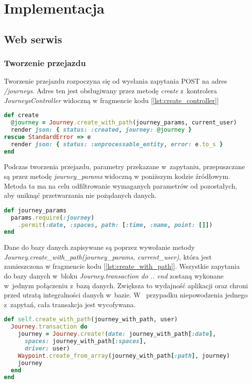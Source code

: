 \documentclass[eng,archivemode]{mgr}
\begin{document}
\chapter{Implementacja}
\section{Web serwis}

\subsection{Tworzenie przejazdu}
Tworzenie przejazdu rozpoczyna się od wysłania zapytania POST na adres \textit{/journeys}. Adres ten jest obsługiwany przez metodę \textit{create} z~kontrolera \textit{JourneysController} widoczną w fragmencie kodu [\ref{lst:create_controller}]

\begin{lstlisting}[language=Ruby, caption={Obsługa zapytania POST na adres /journeys}, label=lst:create_controller]
def create
  @journey = Journey.create_with_path(journey_params, current_user)
  render json: { status: :created, journey: @journey }
rescue StandardError => e
  render json: { status: :unprocessable_entity, error: e.to_s }
end
\end{lstlisting}

Podczas tworzenia przejazdu, parametry przekazane w~zapytaniu, przepuszczane są przez metodę \textit{journey\_params} widoczną w poniższym kodzie źródłowym. Metoda ta ma na celu odfiltrowanie wymaganych parametrów od pozostałych, aby uniknąć przetwarzania nie pożądanych danych.

\begin{lstlisting}[language=Ruby, caption={Odfiltrowanie wymaganych parametrów}, label=lst:journey_params]
def journey_params
  params.require(:journey)
    .permit(:date, :spaces, path: [:time, :name, point: []])
end
\end{lstlisting}

Dane do bazy danych zapisywane są poprzez wywołanie metody \newline \textit{Journey.create\_with\_path(journey\_params, current\_user)}, która jest zamieszczona w fragmencie kodu [\ref{lst:create_with_path}]. Wszystkie zapytania do bazy danych w~bloku \textit{Journey.transaction do .. end} zostaną wykonane w~jednym połączeniu z~bazą danych. Zwiększa to wydajność aplikacji oraz chroni przed utratą integralności danych w~bazie. W~ przypadku niepowodzenia jednego z~zapytań, cała transakcja jest wycofywana.
\newpage
\begin{lstlisting}[language=Ruby, caption={Zapisanie przejazdu w~bazie danych}, label=lst:create_with_path]
def self.create_with_path(journey_with_path, user)
  Journey.transaction do
    journey = Journey.create!(date: journey_with_path[:date],
      spaces: journey_with_path[:spaces],
      driver: user)
    Waypoint.create_from_array(journey_with_path[:path], journey)
    journey
  end
end
\end{lstlisting}
\end{document}
